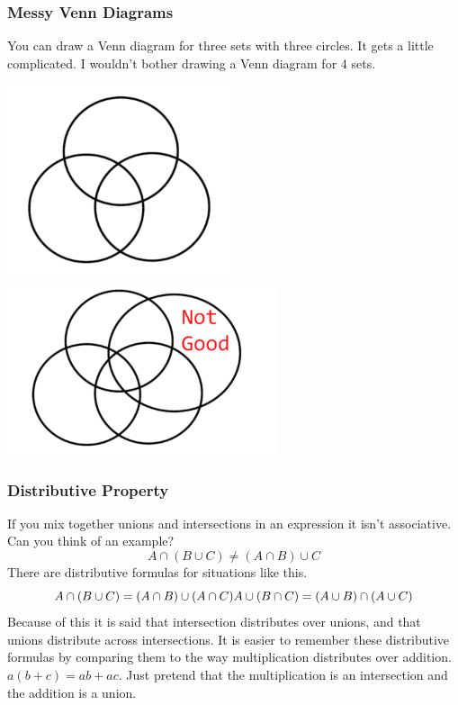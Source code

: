 \documentclass[]{book}
\begin{document}
\subsubsection{Messy Venn Diagrams}\label{messy-venn-diagrams}

You can draw a Venn diagram for three sets with three circles. It gets a
little complicated. I wouldn't bother drawing a Venn diagram for 4 sets.

\includegraphics{Pictures/01-Sets/Venn3.PNG}
\includegraphics{Pictures/01-Sets/Venn4.PNG}

\subsubsection{Distributive Property}\label{distributive-property}

If you mix together unions and intersections in an expression it isn't
associative. Can you think of an example?
\[A \cap (B \cup C) \not= (A \cap B) \cup C\] There are distributive
formulas for situations like this.
\[A \cap (B \cup C) = (A \cap B) \cup (A \cap C) \\
 A \cup (B \cap C) = (A \cup B) \cap (A \cup C)\] Because of this it is
said that intersection distributes over unions, and that unions
distribute across intersections. It is easier to remember these
distributive formulas by comparing them to the way multiplication
distributes over addition. \(a(b+c)=ab+ac\). Just pretend that the
multiplication is an intersection and the addition is a union.
\end{document}
